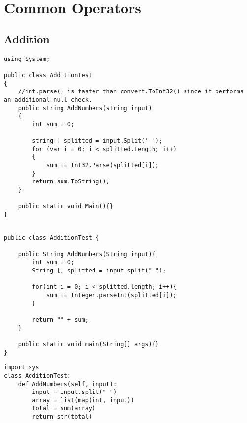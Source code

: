 \section{Common Operators}

\subsection{Addition}

	\lstset{style=sharpc}
	\begin{lstlisting}
using System;

public class AdditionTest
{
    //int.parse() is faster than convert.ToInt32() since it performs an additional null check.
    public string AddNumbers(string input)
    {
        int sum = 0;
        
        string[] splitted = input.Split(' ');
        for (var i = 0; i < splitted.Length; i++)
        {
            sum += Int32.Parse(splitted[i]);
        }
        return sum.ToString();
    }

    public static void Main(){}
}

	\end{lstlisting}

	\lstset{style=java}
	\begin{lstlisting}

public class AdditionTest {
	
	public String AddNumbers(String input){
		int sum = 0;
		String [] splitted = input.split(" ");
		
		for(int i = 0; i < splitted.length; i++){
			sum += Integer.parseInt(splitted[i]);
		}
		
		return "" + sum;
	}
	
	public static void main(String[] args){}	 
}

	\end{lstlisting}

	\lstset{style=python}
	\begin{lstlisting}
import sys
class AdditionTest:
    def AddNumbers(self, input):
        input = input.split(" ")
        array = list(map(int, input))
        total = sum(array)
        return str(total)
	\end{lstlisting}



